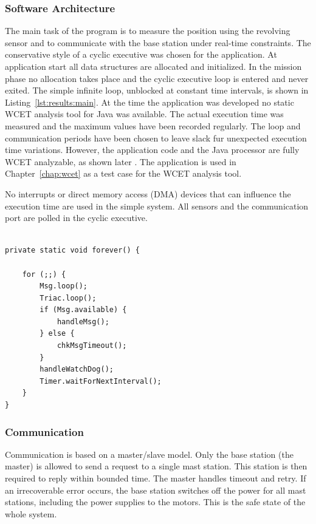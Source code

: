 \subsubsection{Software Architecture}

The main task of the program is to measure the position using the
revolving sensor and to communicate with the base station under
real-time constraints. The conservative style of a cyclic executive
was chosen for the application. At application start all data
structures are allocated and initialized. In the mission phase no
allocation takes place and the cyclic executive loop is entered and
never exited. The simple infinite loop, unblocked at constant time
intervals, is shown in Listing~\ref{lst:results:main}. At the time
the application was developed no static WCET analysis tool for Java
was available. The actual execution time was measured and the maximum
values have been recorded regularly. The loop and communication
periods have been chosen to leave slack fur unexpected execution time
variations. However, the application code and the Java processor are
fully WCET analyzable, as shown later \cite{jop:wcet:jtres06}. The
application is used in Chapter~\ref{chap:wcet} as a test case for the
WCET analysis tool.

No interrupts or direct memory access (DMA) devices that can
influence the execution time are used in the simple system. All
sensors and the communication port are polled in the cyclic
executive.

\begin{lstlisting}[float,caption=The cyclic executive (simplified version),
label=lst:results:main]

private static void forever() {

    for (;;) {
        Msg.loop();
        Triac.loop();
        if (Msg.available) {
            handleMsg();
        } else {
            chkMsgTimeout();
        }
        handleWatchDog();
        Timer.waitForNextInterval();
    }
}
\end{lstlisting}

\subsubsection{Communication}

Communication is based on a master/slave model. Only the base station
(the master) is allowed to send a request to a single mast station.
This station is then required to reply within bounded time. The
master handles timeout and retry. If an irrecoverable error occurs,
the base station switches off the power for all mast stations,
including the power supplies to the motors. This is the safe state of
the whole system.

